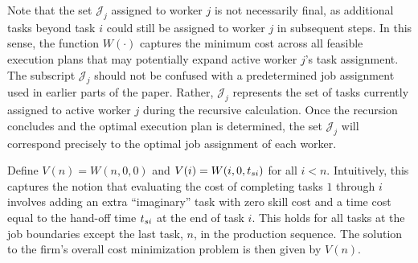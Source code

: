 \documentclass{article}
\theoremstyle{plain}
\theoremstyle{plain}
\begin{document}
Note that the set $\mathcal{J}_j$ assigned to worker $j$ is not necessarily final, as additional tasks beyond task $i$ could still be assigned to worker $j$ in subsequent steps.
In this sense, the function $W(\cdot)$ captures the minimum cost across all feasible execution plans that may potentially expand active worker $j$'s task assignment.
The subscript $\mathcal{J}_j$ should not be confused with a predetermined job assignment used in earlier parts of the paper.
Rather, $\mathcal{J}_j$ represents the set of tasks currently assigned to active worker $j$ during the recursive calculation.
Once the recursion concludes and the optimal execution plan is determined, the set $\mathcal{J}_j$ will correspond precisely to the optimal job assignment of each worker.

Define $V(n) = W(n, 0, 0)$ and $V(i) = W(i, 0, t_{si})$ for all $i < n$.
Intuitively, this captures the notion that evaluating the cost of completing tasks $1$ through $i$ involves adding an extra ``imaginary'' task with zero skill cost and a time cost equal to the hand-off time $t_{si}$ at the end of task $i$. 
This holds for all tasks at the job boundaries except the last task, $n$, in the production sequence.
The solution to the firm's overall cost minimization problem is then given by $V(n)$.
\end{document}
